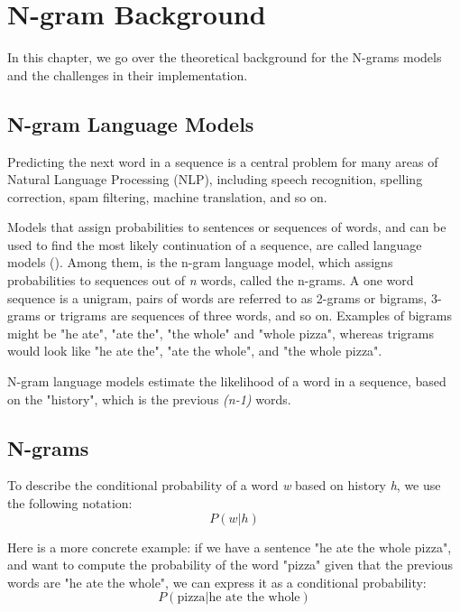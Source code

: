 \chapter{N-gram Background}
\label{chap:NgramBackground}

In this chapter, we go over the theoretical background for the N-grams models and the challenges in their implementation.

\section{N-gram Language Models}
\label{sec:NgramBackground-LanguageModels}
Predicting the next word in a sequence is a central problem for many areas of Natural Language Processing (NLP), including speech recognition, spelling correction, spam filtering, machine translation, and so on.

Models that assign probabilities to sentences or sequences of words, and can be used to find the most likely continuation of a sequence, are called language models (\cite{Jura09a}). Among them, is the n-gram language model, which assigns probabilities to sequences out of \textit{n} words, called the n-grams. A one word sequence is a unigram, pairs of words are referred to as 2-grams or bigrams, 3-grams or trigrams are sequences of three words, and so on. Examples of bigrams might be "he ate", "ate the", "the whole" and "whole pizza", whereas trigrams would look like "he ate the", "ate the whole", and "the whole pizza". 

N-gram language models estimate the likelihood of a word in a sequence, based on the "history", which is the previous \textit{(n-1)} words.

\section{N-grams}
\label{sec:NgramBackground-Ngrams}
To describe the conditional probability of a word \textit{w} based on history \textit{h}, we use the following notation:
\begin{equation}
    P(w|h)
\end{equation}

Here is a more concrete example: if we have a sentence "he ate the whole pizza", and want to compute the probability of the word "pizza" given that the previous words are "he ate the whole", we can express it as a conditional probability:
\begin{equation}
    P(\text{pizza}|\text{he ate the whole})
\end{equation}

